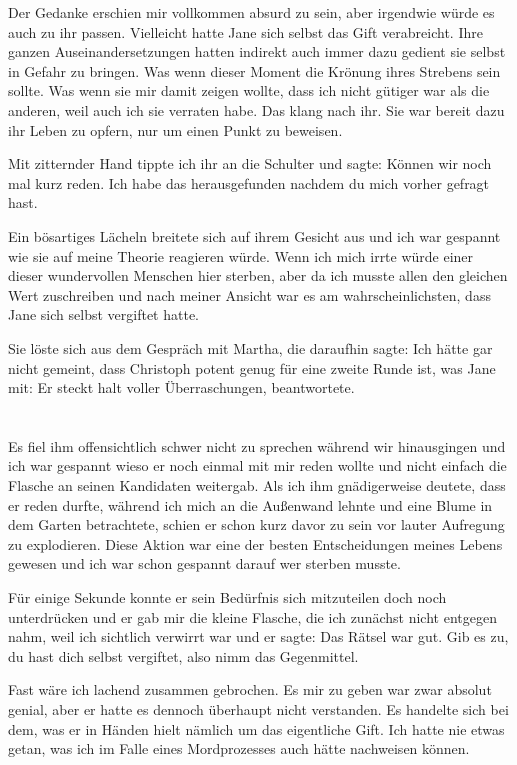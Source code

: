 \documentclass[11pt, a5paper]{article}
\newcommand{\e}{Christoph }
\newcommand{\te}{Jane } %
\newcommand{\Gf}{Martha}
\begin{document}
\begin{spacing}{1.2}
		Der Gedanke erschien mir vollkommen absurd zu sein, aber irgendwie würde es auch zu ihr passen. Vielleicht hatte \te sich selbst das Gift verabreicht. Ihre ganzen Auseinandersetzungen hatten indirekt auch immer dazu gedient sie selbst in Gefahr zu bringen. Was wenn dieser Moment die Krönung ihres Strebens sein sollte. Was wenn sie mir damit zeigen wollte, dass ich nicht gütiger war als die anderen, weil auch ich sie verraten habe. Das klang nach ihr. Sie war bereit dazu ihr Leben zu opfern, nur um einen Punkt zu beweisen.
		
		Mit zitternder Hand tippte ich ihr an die Schulter und sagte: \frqq Können wir noch mal kurz reden. Ich habe das herausgefunden nachdem du mich vorher gefragt hast.\flqq
		
		Ein bösartiges Lächeln breitete sich auf ihrem Gesicht aus und ich war gespannt wie sie auf meine Theorie reagieren würde. Wenn ich mich irrte würde einer dieser wundervollen Menschen hier sterben, aber da ich musste allen den gleichen Wert zuschreiben und nach meiner Ansicht war es am wahrscheinlichsten, dass \te sich selbst vergiftet hatte.
		
		Sie löste sich aus dem Gespräch mit \Gf, die daraufhin sagte: \frqq Ich hätte gar nicht gemeint, dass \e potent genug für eine zweite Runde ist\flqq, was \te mit: \frqq Er steckt halt voller Überraschungen\flqq , beantwortete.\newpage
		
		\section{}
		Es fiel ihm offensichtlich schwer nicht zu sprechen während wir hinausgingen und ich war gespannt wieso er noch einmal mit mir reden wollte und nicht einfach die Flasche an seinen Kandidaten weitergab. Als ich ihm gnädigerweise deutete, dass er reden durfte, während ich mich an die Außenwand lehnte und eine Blume in dem Garten betrachtete, schien er schon kurz davor zu sein vor lauter Aufregung zu explodieren. Diese Aktion war eine der besten Entscheidungen meines Lebens gewesen und ich war schon gespannt darauf wer sterben musste.
		
		Für einige Sekunde konnte er sein Bedürfnis sich mitzuteilen doch noch unterdrücken und er gab mir die kleine Flasche, die ich zunächst nicht entgegen nahm, weil ich sichtlich verwirrt war und er sagte: \frqq Das Rätsel war gut. Gib es zu, du hast dich selbst vergiftet, also nimm das Gegenmittel.\flqq
		
		Fast wäre ich lachend zusammen gebrochen. Es mir zu geben war zwar absolut genial, aber er hatte es dennoch überhaupt nicht verstanden. Es handelte sich bei dem, was er in Händen hielt nämlich um das eigentliche Gift. Ich hatte nie etwas getan, was ich im Falle eines Mordprozesses auch hätte nachweisen können.
		

\end{spacing}
\end{document}

